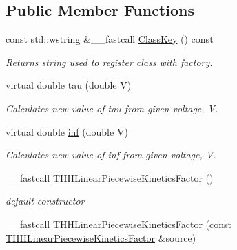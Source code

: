 \subsection*{Public Member Functions}
\begin{DoxyCompactItemize}
\item 
const std\+::wstring \&\+\_\+\+\_\+fastcall \hyperlink{class_t_h_h_linear_piecewise_kinetics_factor_a2129c509478fcca9cb2479817856c0bf}{Class\+Key} () const 
\begin{DoxyCompactList}\small\item\em Returns string used to register class with factory. \end{DoxyCompactList}\item 
\hypertarget{class_t_h_h_linear_piecewise_kinetics_factor_afb243ba364ac0e3f52b2859b41d03b49}{virtual double \hyperlink{class_t_h_h_linear_piecewise_kinetics_factor_afb243ba364ac0e3f52b2859b41d03b49}{tau} (double V)}\label{class_t_h_h_linear_piecewise_kinetics_factor_afb243ba364ac0e3f52b2859b41d03b49}

\begin{DoxyCompactList}\small\item\em Calculates new value of tau from given voltage, V. \end{DoxyCompactList}\item 
\hypertarget{class_t_h_h_linear_piecewise_kinetics_factor_a351152558aaa57d4d1ad76f8678be006}{virtual double \hyperlink{class_t_h_h_linear_piecewise_kinetics_factor_a351152558aaa57d4d1ad76f8678be006}{inf} (double V)}\label{class_t_h_h_linear_piecewise_kinetics_factor_a351152558aaa57d4d1ad76f8678be006}

\begin{DoxyCompactList}\small\item\em Calculates new value of inf from given voltage, V. \end{DoxyCompactList}\item 
\hypertarget{class_t_h_h_linear_piecewise_kinetics_factor_a715ee195ff8f19488a7a8ea96b91ee84}{\+\_\+\+\_\+fastcall \hyperlink{class_t_h_h_linear_piecewise_kinetics_factor_a715ee195ff8f19488a7a8ea96b91ee84}{T\+H\+H\+Linear\+Piecewise\+Kinetics\+Factor} ()}\label{class_t_h_h_linear_piecewise_kinetics_factor_a715ee195ff8f19488a7a8ea96b91ee84}

\begin{DoxyCompactList}\small\item\em default constructor \end{DoxyCompactList}\item 
\hypertarget{class_t_h_h_linear_piecewise_kinetics_factor_ae0f4efc8e965d584fca76c719bbc4ebf}{\+\_\+\+\_\+fastcall \hyperlink{class_t_h_h_linear_piecewise_kinetics_factor_ae0f4efc8e965d584fca76c719bbc4ebf}{T\+H\+H\+Linear\+Piecewise\+Kinetics\+Factor} (const \hyperlink{class_t_h_h_linear_piecewise_kinetics_factor}{T\+H\+H\+Linear\+Piecewise\+Kinetics\+Factor} \&source)}\label{class_t_h_h_linear_piecewise_kinetics_factor_ae0f4efc8e965d584fca76c719bbc4ebf}


\end{DoxyCompactItemize}
